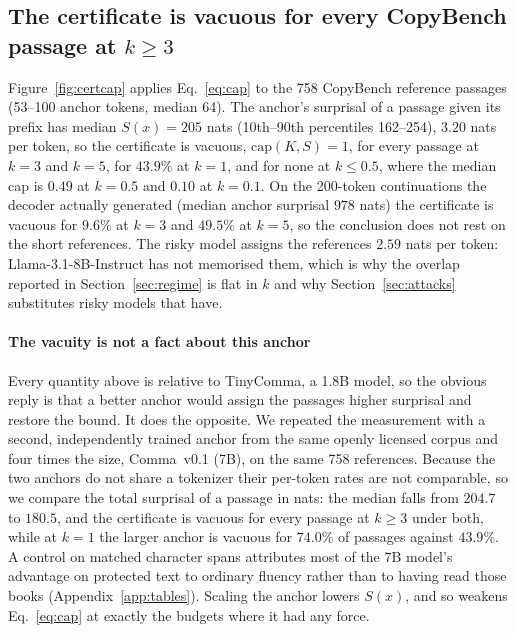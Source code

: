 \subsection{The certificate is vacuous for every CopyBench passage at $k \ge 3$}\label{sec:certificate}
Figure~\ref{fig:certcap} applies Eq.~\eqref{eq:cap} to the 758 CopyBench reference passages (53--100 anchor tokens, median 64). The anchor's surprisal of a passage given its prefix has median $S(x) = 205$ nats (10th--90th percentiles 162--254), $3.20$ nats per token, so the certificate is vacuous, $\mathrm{cap}(K,S)=1$, for every passage at $k=3$ and $k=5$, for $43.9\%$ at $k=1$, and for none at $k \le 0.5$, where the median cap is $0.49$ at $k=0.5$ and $0.10$ at $k=0.1$. On the 200-token continuations the decoder actually generated (median anchor surprisal $978$ nats) the certificate is vacuous for $9.6\%$ at $k=3$ and $49.5\%$ at $k=5$, so the conclusion does not rest on the short references. The risky model assigns the references $2.59$ nats per token: Llama-3.1-8B-Instruct has not memorised them, which is why the overlap reported in Section~\ref{sec:regime} is flat in $k$ and why Section~\ref{sec:attacks} substitutes risky models that have.

\paragraph{The vacuity is not a fact about this anchor}
Every quantity above is relative to TinyComma, a 1.8B model, so the obvious reply is that a better anchor would assign the passages higher surprisal and restore the bound. It does the opposite. We repeated the measurement with a second, independently trained anchor from the same openly licensed corpus and four times the size, Comma~v0.1 (7B), on the same 758 references. Because the two anchors do not share a tokenizer their per-token rates are not comparable, so we compare the total surprisal of a passage in nats: the median falls from $204.7$ to $180.5$, and the certificate is vacuous for every passage at $k \ge 3$ under both, while at $k=1$ the larger anchor is vacuous for $74.0\%$ of passages against $43.9\%$. A control on matched character spans attributes most of the 7B model's advantage on protected text to ordinary fluency rather than to having read those books (Appendix~\ref{app:tables}). Scaling the anchor lowers $S(x)$, and so weakens Eq.~\eqref{eq:cap} at exactly the budgets where it had any force.


